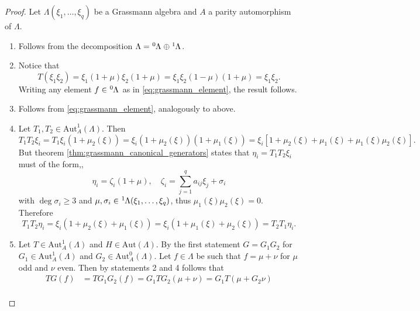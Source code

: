 \documentclass{article}
\theoremstyle{definition}
\begin{document}
\begin{proof}
    Let $\Lambda(\xi_1, \dots, \xi_q)$ be a Grassmann algebra and $A$ a parity automorphism of $\Lambda$.
    \begin{enumerate}
        \item Follows from the decomposition $\Lambda = \tensor[^0]{\Lambda}{} \oplus \tensor[^1]{\Lambda}{}$.
        \item Notice that
        \begin{equation*}
            T(\xi_1 \xi_2) = \xi_1(1 + \mu)\xi_2(1 + \mu) = \xi_1 \xi_2 (1 - \mu)(1 + \mu) = \xi_1 \xi_2.
        \end{equation*}
        Writing any element $f \in \tensor[^0]{\Lambda}{}$ as in \eqref{eq:grassmann_element}, the result follows.
        \item Follows from \eqref{eq:grassmann_element}, analogously to above.
        \item Let $T_1, T_2 \in \text{Aut}_A^1(\Lambda)$. Then
        \begin{equation*}
            T_1 T_2 \xi_i = T_1 \xi_i (1 + \mu_2(\xi))
            = \xi_i(1 + \mu_2(\xi))(1 + \mu_1(\xi))
            = \xi_i \left[1 + \mu_2(\xi) + \mu_1(\xi) + \mu_1(\xi) \mu_2(\xi) \right].
        \end{equation*}
        But theorem \ref{thm:grassmann_canonical_generators} states that $\eta_i = T_1 T_2 \xi_i$ must of the form,,
        \begin{equation*}
            \eta_i = \zeta_i ( 1 + \mu), \quad \zeta_i = \sum_{j = 1}^q a_{ij} \xi_j + \sigma_i
        \end{equation*}
        with $\deg \sigma_i \geq 3$ and $\mu, \sigma_i \in \tensor[^1]{\Lambda(\xi_1, \dots, \xi_q)}{}$, thus $\mu_1(\xi) \mu_2(\xi) = 0$. Therefore
        \begin{equation*}
            T_1 T_2 \eta_i = \xi_i(1 + \mu_2(\xi) + \mu_1(\xi)) = \xi_i(1 + \mu_1(\xi) + \mu_2(\xi)) = T_2 T_1 \eta_i.
        \end{equation*}
        \item Let $T \in \text{Aut}_A^1(\Lambda)$ and $H \in \text{Aut}(\Lambda)$. By the first statement $G = G_1 G_2$ for $G_1 \in \text{Aut}_A^1(\Lambda)$ and $G_2 \in \text{Aut}_A^0(\Lambda)$. Let $f \in \Lambda$ be such that $f = \mu + \nu$ for $\mu$ odd and $\nu$ even. Then by statements 2 and 4 follows that
        \begin{align*}
            T G(f) &= T G_1 G_2(f) = G_1 T G_2 (\mu + \nu) = G_1 T (\mu + G_2 \nu) \\

\end{align*}
\end{enumerate}
\end{proof}
\end{document}
